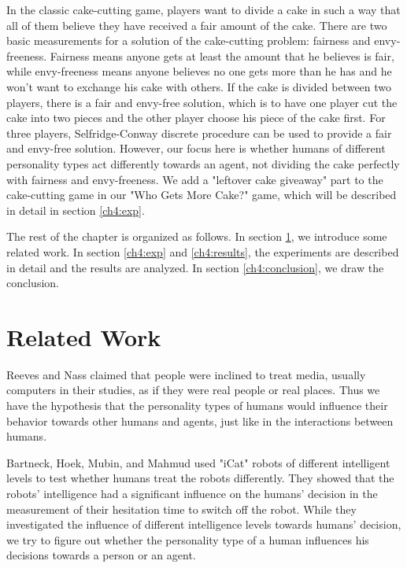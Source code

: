 In the classic cake-cutting game, players want to divide a cake in such a way that all of them believe they have received a fair amount of the cake. There are two basic measurements for a solution of the cake-cutting problem: fairness and envy-freeness. Fairness means anyone gets at least the amount that he believes is fair, while envy-freeness means anyone believes no one gets more than he has and he won't want to exchange his cake with others. If the cake is divided between two players, there is a fair and envy-free solution, which is to have one player cut the cake into two pieces and the other player choose his piece of the cake first. For three players, Selfridge-Conway discrete procedure \cite{robertson1998cake} can be used to provide a fair and envy-free solution. However, our focus here is whether humans of different personality types act differently towards an agent, not dividing the cake perfectly with fairness and envy-freeness. We add a "leftover cake giveaway" part to the cake-cutting game in our "Who Gets More Cake?" game, which will be described in detail in section \ref{ch4:exp}. 

The rest of the chapter is organized as follows. In section \ref{ch4:related}, we introduce some related work. In section \ref{ch4:exp} and \ref{ch4:results}, the experiments are described in detail and the results are analyzed. In section \ref{ch4:conclusion}, we draw the conclusion.

\section{Related Work}
\label{ch4:related}
Reeves and Nass \cite{Reeves1996} claimed that people were inclined to treat media, usually computers in their studies, as if they were real people or real places. Thus we have the hypothesis that the personality types of humans would influence their behavior towards other humans and agents, just like in the interactions between humans.

Bartneck, Hoek, Mubin, and Mahmud \cite{Bartneck2007} used "iCat" robots of different intelligent levels to test whether humans treat the robots differently. They showed that the robots' intelligence had a significant influence on the humans' decision in the measurement of their hesitation time to switch off the robot. While they investigated the influence of different intelligence levels towards humans' decision, we try to figure out whether the personality type of a human influences his decisions towards a person or an agent. 

